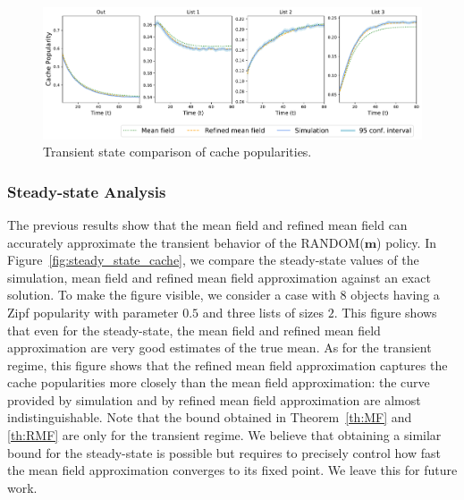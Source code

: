 \documentclass[acmsmall]{acmart}
\newcommand\bm{\mathbf{m}}
\begin{document}
\begin{figure}[ht]
  \includegraphics[width=\textwidth]{popularities_caches.pdf}
  \caption{Transient state comparison of cache popularities.}
  \label{fig:transient_cache_popularities}
\end{figure}



\subsubsection{Steady-state Analysis}


The previous results show that the mean field and refined mean field can accurately approximate the transient behavior of the RANDOM($\bm$) policy. In Figure~\ref{fig:steady_state_cache}, we compare the steady-state values of the simulation, mean field and refined mean field approximation against an exact solution. To make the figure visible, we consider a case with $8$ objects having a Zipf popularity with parameter $0.5$ and three lists of sizes $2$. This figure shows that even for the steady-state, the mean field and refined mean field approximation are very good estimates of the true mean. As for the transient regime, this figure shows that the refined mean field approximation captures the cache popularities more closely than the mean field approximation: the curve provided by simulation and by refined mean field approximation are almost indistinguishable. Note that the bound obtained in Theorem~\ref{th:MF} and \ref{th:RMF} are only for the transient regime. We believe that obtaining a similar bound for the steady-state is possible but requires to precisely control how fast the mean field approximation converges to its fixed point. We leave this for future work.
\end{document}
